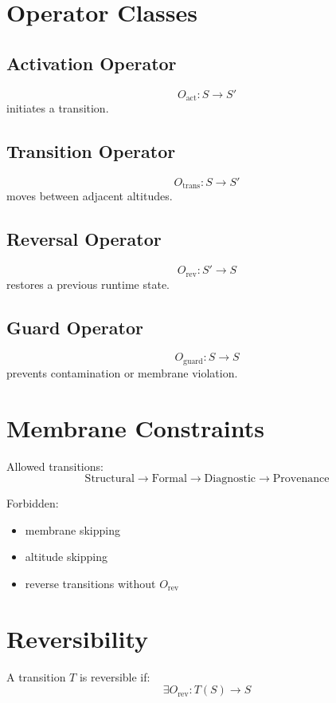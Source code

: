 \documentclass[12pt]{article}
\begin{document}
\section{Operator Classes}

\subsection{Activation Operator}
\[
O_{\text{act}} : S \rightarrow S'
\]
initiates a transition.

\subsection{Transition Operator}
\[
O_{\text{trans}} : S \rightarrow S'
\]
moves between adjacent altitudes.

\subsection{Reversal Operator}
\[
O_{\text{rev}} : S' \rightarrow S
\]
restores a previous runtime state.

\subsection{Guard Operator}
\[
O_{\text{guard}} : S \rightarrow S
\]
prevents contamination or membrane violation.

\section{Membrane Constraints}

Allowed transitions:
\[
\text{Structural} \rightarrow \text{Formal} \rightarrow \text{Diagnostic} \rightarrow \text{Provenance}
\]

Forbidden:
\begin{itemize}
  \item membrane skipping
  \item altitude skipping
  \item reverse transitions without $O_{\text{rev}}$
\end{itemize}

\section{Reversibility}

A transition $T$ is reversible if:
\[
\exists O_{\text{rev}} : T(S) \rightarrow S
\]
\end{document}
